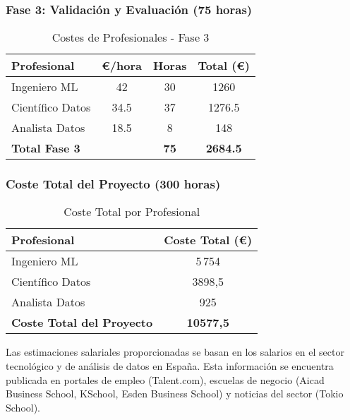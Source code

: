 \subsubsection*{Fase 3: Validación y Evaluación (75 horas)}
\begin{table}[H]
\centering
\begin{tabular}{lccc}
\toprule
Profesional & €/hora & Horas & Total (€) \\
\midrule
Ingeniero ML & 42 & 30 & 1260 \\
Científico Datos & 34.5 & 37 & 1276.5 \\
Analista Datos & 18.5 & 8 & 148 \\
\midrule
\textbf{Total Fase 3} & & \textbf{75} & \textbf{2684.5} \\
\bottomrule
\end{tabular}
\caption{Costes de Profesionales - Fase 3}
\label{tab:costes_fase3}
\end{table}

\subsubsection*{Coste Total del Proyecto (300 horas)}
\begin{table}[H]
\centering
\begin{tabular}{lc}
\toprule
Profesional & Coste Total (€) \\
\midrule
Ingeniero ML & 5\,754 \\
Científico Datos & 3898,5 \\
Analista Datos & 925 \\
\midrule
\textbf{Coste Total del Proyecto} & \textbf{10577,5} \\
\bottomrule
\end{tabular}
\caption{Coste Total por Profesional}
\label{tab:coste_total_profesional}
\end{table}


Las estimaciones salariales proporcionadas se basan en los salarios en el sector tecnológico y de análisis de datos en España. Esta información se encuentra publicada en portales de empleo (Talent.com), escuelas de negocio (Aicad Business School, KSchool, Esden Business School) y noticias del sector (Tokio School). 










